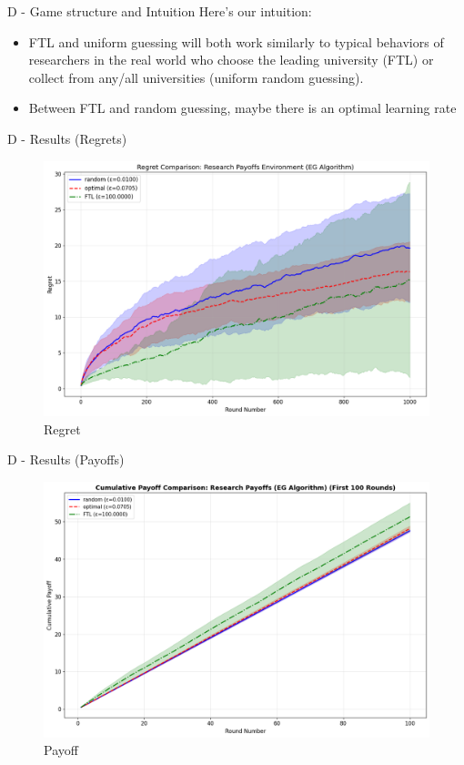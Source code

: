 \documentclass{beamer}
\begin{document}
\begin{frame}{D - Game structure and Intuition}
Here's our intuition:
\begin{itemize}
    \item FTL and uniform guessing will both work similarly to typical behaviors of researchers in the real world who choose the leading university (FTL) or collect from any/all universities (uniform random guessing).
    \item Between FTL and random guessing, maybe there is an optimal learning rate
\end{itemize}
\end{frame}

\begin{frame}{D - Results (Regrets)}
\begin{figure}
    \centering
    \includegraphics[width=0.8\linewidth]{332Project2/figures/RP_regret.png}
    \caption{Regret}
    \label{fig:placeholder}
\end{figure}
\end{frame}

\begin{frame}{D - Results (Payoffs)}
\begin{figure}
    \centering
    \includegraphics[width=0.8\linewidth]{332Project2/figures/RP_payoff.png}
    \caption{Payoff}
    \label{fig:placeholder}
\end{figure}
\end{frame}
\end{document}
